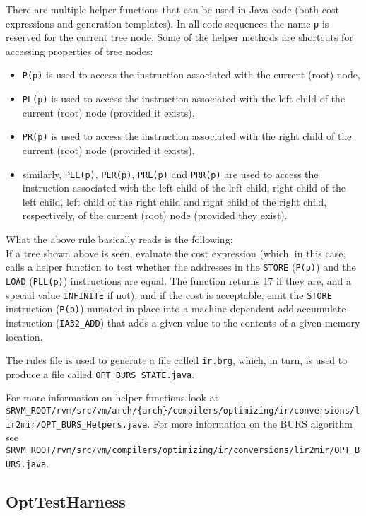 There are multiple helper functions that can be used in Java code (both cost
expressions and generation templates).  In all code sequences the name
{\tt p} is reserved for the current tree node.  Some of the helper methods
are shortcuts for accessing properties of tree nodes:
\begin{itemize}
\item {\tt P(p)} is used to access the instruction associated with the
current (root) node,
\item {\tt PL(p)} is used to access the instruction associated with the left
child of the current (root) node (provided it exists),
\item {\tt PR(p)} is used to access the instruction associated with the
right child of the current (root) node (provided it exists),
\item similarly, {\tt PLL(p)}, {\tt PLR(p)}, {\tt PRL(p)} and {\tt PRR(p)}
are used to access the instruction associated with the
left child of the left child, right child of the left child, left child of
the right child and right child of the right child, respectively, of the
current (root) node (provided they exist).
\end{itemize}

What the above rule basically reads is the following:\\
If a tree shown above is seen, evaluate the cost expression (which, in this
case, calls a helper function to test whether the addresses in the
{\tt STORE} ({\tt P(p)}) and the {\tt LOAD} ({\tt PLL(p)}) instructions are
equal.  The function returns 17 if they are, and a special value
{\tt INFINITE} if not), and if the cost is acceptable, emit the {\tt STORE}
instruction ({\tt P(p)}) mutated in place into a machine-dependent
add-accumulate instruction ({\tt IA32\_ADD}) that adds a given value to the
contents of a given memory location.

The rules file is used to generate a file called {\tt ir.brg}, which, in
turn, is used to produce a file called {\tt OPT\_BURS\_STATE.java}.

For more information on helper functions look at
{\tt \$RVM\_ROOT/rvm/src/vm/arch/\{arch\}/compilers/optimizing/ir/conversions/lir2mir/OPT\_BURS\_Helpers.java}.
For more information on the BURS algorithm see
{\tt \$RVM\_ROOT/rvm/src/vm/compilers/optimizing/ir/conversions/lir2mir/OPT\_BURS.java}.

\JavaTMFooter

\PowerPCTMFooter


\subsection{OptTestHarness}\label{opttestharness}

